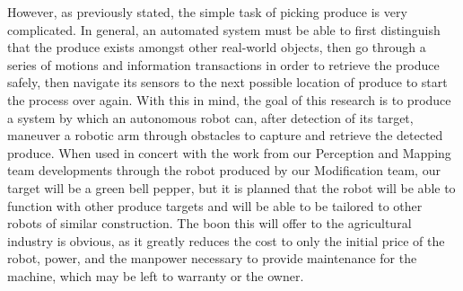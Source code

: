 \documentclass[titlepage]{article}
\begin{document}
However, as previously stated, the simple task of picking produce is very complicated. In general, an automated system must be able to first distinguish that the produce exists amongst other real-world objects, then go through a series of motions and information transactions in order to retrieve the produce safely, then navigate its sensors to the next possible location of produce to start the process over again.
With this in mind, the goal of this research is to produce a system by which an autonomous robot can, after detection of its target, maneuver a robotic arm through obstacles to capture and retrieve the detected produce. When used in concert with the work from our Perception and Mapping team developments through the robot produced by our Modification team, our target will be a green bell pepper, but it is planned that the robot will be able to function with other produce targets and will be able to be tailored to other robots of similar construction. The boon this will offer to the agricultural industry is obvious, as it greatly reduces the cost to only the initial price of the robot, power, and the manpower necessary to provide maintenance for the machine, which may be left to warranty or the owner.
\end{document}
